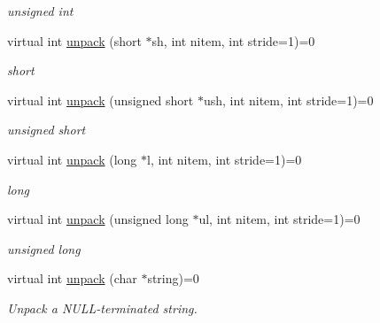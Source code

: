 \begin{Indent}
\begin{DoxyCompactItemize}
\begin{DoxyCompactList}\small\item\em unsigned int \end{DoxyCompactList}\item 
\mbox{\label{classMWRMComm_a95a4054e0b75b56b7318c3d6756a4a33}} 
virtual int \hyperlink{classMWRMComm_a95a4054e0b75b56b7318c3d6756a4a33}{unpack} (short $\ast$sh, int nitem, int stride=1)=0
\begin{DoxyCompactList}\small\item\em short \end{DoxyCompactList}\item 
\mbox{\label{classMWRMComm_a8778534aaef8a935bf43f7a3b5edcdc5}} 
virtual int \hyperlink{classMWRMComm_a8778534aaef8a935bf43f7a3b5edcdc5}{unpack} (unsigned short $\ast$ush, int nitem, int stride=1)=0
\begin{DoxyCompactList}\small\item\em unsigned short \end{DoxyCompactList}\item 
\mbox{\label{classMWRMComm_a0c4b6e41adbef7bfb4c26e120dd2d3f0}} 
virtual int \hyperlink{classMWRMComm_a0c4b6e41adbef7bfb4c26e120dd2d3f0}{unpack} (long $\ast$l, int nitem, int stride=1)=0
\begin{DoxyCompactList}\small\item\em long \end{DoxyCompactList}\item 
\mbox{\label{classMWRMComm_a789b8c27745d87118d1eb951518499ac}} 
virtual int \hyperlink{classMWRMComm_a789b8c27745d87118d1eb951518499ac}{unpack} (unsigned long $\ast$ul, int nitem, int stride=1)=0
\begin{DoxyCompactList}\small\item\em unsigned long \end{DoxyCompactList}\item 
\mbox{\label{classMWRMComm_a277f159c464e1977f5fa5ef04f377f6c}} 
virtual int \hyperlink{classMWRMComm_a277f159c464e1977f5fa5ef04f377f6c}{unpack} (char $\ast$string)=0
\begin{DoxyCompactList}\small\item\em Unpack a N\+U\+L\+L-\/terminated string. \end{DoxyCompactList}\end{DoxyCompactItemize}
\end{Indent}
